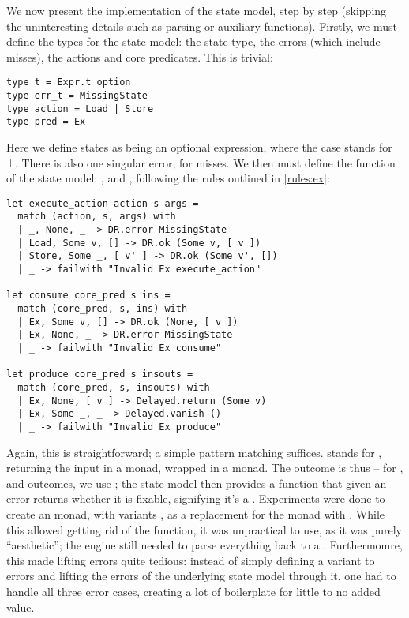 We now present the implementation of the \Ex{} state model, step by step (skipping the uninteresting details such as parsing or auxiliary functions). Firstly, we must define the types for the state model: the state type, the errors (which include misses), the actions and core predicates. This is trivial: \begin{lstlisting}
type t = Expr.t option
type err_t = MissingState
type action = Load | Store
type pred = Ex
\end{lstlisting}
Here we define states as being an optional expression, where the  case stands for $\bot$. There is also one singular error, for misses. We then must define the function of the state model: \execac, \consume{} and \produce, following the rules outlined in \cref{rules:ex}: \begin{lstlisting}
let execute_action action s args =
  match (action, s, args) with
  | _, None, _ -> DR.error MissingState
  | Load, Some v, [] -> DR.ok (Some v, [ v ])
  | Store, Some _, [ v' ] -> DR.ok (Some v', [])
  | _ -> failwith "Invalid Ex execute_action"

let consume core_pred s ins =
  match (core_pred, s, ins) with
  | Ex, Some v, [] -> DR.ok (None, [ v ])
  | Ex, None, _ -> DR.error MissingState
  | _ -> failwith "Invalid Ex consume"

let produce core_pred s insouts =
  match (core_pred, s, insouts) with
  | Ex, None, [ v ] -> Delayed.return (Some v)
  | Ex, Some _, _ -> Delayed.vanish ()
  | _ -> failwith "Invalid Ex produce"
\end{lstlisting}
Again, this is straightforward; a simple pattern matching suffices.  stands for \mbox{}, returning the input in a  monad, wrapped in a  monad. The outcome is thus \Ok{} -- for \Err{}, \LFail{} and \Miss{} outcomes, we use ; the state model then provides a  function that given an error returns whether it is fixable, signifying it's a \Miss. Experiments were done to create an  monad, with variants , as a replacement for the  monad with . While this allowed getting rid of the  function, it was unpractical to use, as it was purely ``aesthetic''; the engine still needed to parse everything back to a . Furthermomre, this made lifting errors quite tedious: instead of simply defining a  variant to errors and lifting the errors of the underlying state model through it, one had to handle all three error cases, creating a lot of boilerplate for little to no added value.

